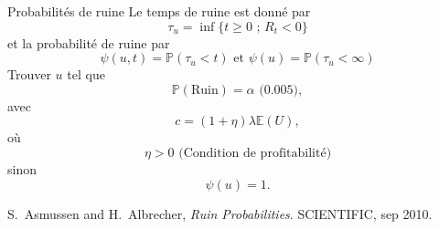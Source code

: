 \documentclass{beamer}
\begin{document}
\begin{frame}{Probabilités de ruine}
\scriptsize
Le temps de ruine est donné par
$$
\tau_u = \inf\{t\geq0\text{ ; }R_t <0\}
$$
et la probabilité de ruine par
$$
\psi(u,t) = \mathbb{P}(\tau_u < t)\text{ et }\psi(u) = \mathbb{P}(\tau_u < \infty)
$$
Trouver $u$ tel que 
$$
\mathbb{P}(\text{Ruin}) = \alpha\text{ (0.005)},
$$
avec
$$
c=(1+\eta)\lambda\mathbb{E}(U),
$$
où 
$$\eta>0\text{ (Condition de profitabilité)}$$  
sinon 
$$\psi(u)=1.$$

\tiny
\begin{thebibliography}{1}

S.~Asmussen and H.~Albrecher, {\em Ruin Probabilities}.
 {SCIENTIFIC}, sep 2010.

\end{thebibliography}

\end{frame}
\end{document}
